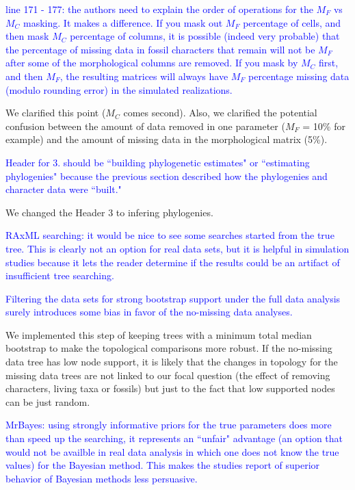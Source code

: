 \documentclass[11pt]{letter}
\begin{document}
\begin{letter}{}
\textcolor{blue}{line 171 - 177: the authors need to explain the order of operations for the $M_F$ vs $M_C$ masking. It makes a difference. If you mask out $M_F$ percentage of cells, and then mask $M_C$ percentage of columns, it is possible (indeed very probable) that the percentage of missing data in fossil characters that remain will not be $M_F$ after some of the morphological columns are removed. If you mask by $M_C$ first, and then $M_F$, the resulting matrices will always have $M_F$ percentage missing data (modulo rounding error) in the simulated realizations.}

We clarified this point ($M_C$ comes second). %
Also, we clarified the potential confusion between the amount of data removed in one parameter ($M_F$ = 10\% for example) and the amount of missing data in the morphological matrix (5\%). %

\textcolor{blue}{Header for 3. should be ``building phylogenetic estimates" or ``estimating phylogenies" because the previous section described how the phylogenies and character data were ``built."}

We changed the Header 3 to infering phylogenies. %

\textcolor{blue}{RAxML searching: it would be nice to see some searches started from the true tree. This is clearly not an option for real data sets, but it is helpful in simulation studies because it lets the reader determine if the results could be an artifact of insufficient tree searching.}


\textcolor{blue}{Filtering the data sets for strong bootstrap support under the full data analysis surely introduces some bias in favor of the no-missing data analyses.}

We implemented this step of keeping trees with a minimum total median bootstrap to make the topological comparisons more robust. If the no-missing data tree has low node support, it is likely that the changes in topology for the missing data trees are not linked to our focal question (the effect of removing characters, living taxa or fossils) but just to the fact that low supported nodes can be just random.

\textcolor{blue}{MrBayes: using strongly informative priors for the true parameters does more than speed up the searching, it represents an ``unfair" advantage (an option that would not be availble in real data analysis in which one does not know the true values) for the Bayesian method. This makes the studies report of superior behavior of Bayesian methods less persuasive.}


\end{letter}
\end{document}
